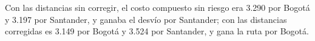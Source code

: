 Con las distancias sin corregir, el costo compuesto sin riesgo era 3.290 por Bogotá y 3.197 por Santander, y ganaba el desvío por Santander; con las distancias corregidas es 3.149 por Bogotá y 3.524 por Santander, y gana la ruta por Bogotá.
